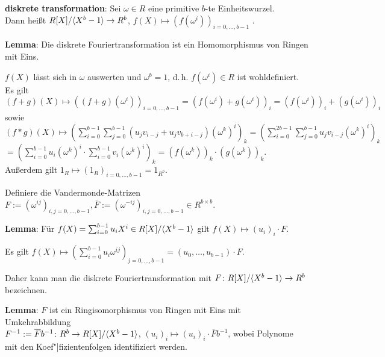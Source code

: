 \textbf{diskrete transformation}:
Sei $\omega \in R$ eine primitive $b$-te Einheitswurzel.\\
Dann heißt $R[X]/\langle X^b - 1\rangle \to R^b$,
$f(X) \mapsto (f(\omega^i))_{i=0,\dotsc,b-1}$
.

\textbf{Lemma}:
Die diskrete Fouriertransformation ist ein Homomorphismus von Ringen mit Eins.

\begin{Beweis}
    $f(X)$ lässt sich in $\omega$ auswerten und $\omega^b = 1$,
    d.\,h. $f(\omega^i) \in R$ ist wohldefiniert.\\
    Es gilt $(f + g)(X) \mapsto ((f + g)(\omega^i))_{i=0,\dotsc,b-1}
    = (f(\omega^i) + g(\omega^i))_i
    = (f(\omega^i))_i + (g(\omega^i))_i$
    sowie
    $(f \ast g)(X) \mapsto
    (\sum_{i=0}^{b-1} \sum_{j=0}^{b-1} (u_j v_{i-j} + u_j v_{b+i-j}) (\omega^k)^i)_k
    = (\sum_{i=0}^{2b-1} \sum_{j=0}^{b-1} u_j v_{i-j} (\omega^k)^i)_k$\\
    $= (\sum_{i=0}^{b-1} u_i (\omega^k)^i \cdot \sum_{i=0}^{b-1} v_i (\omega^k)^i)_k
    = (f(\omega^k))_k \cdot (g(\omega^k))_k$.\\
    Außerdem gilt $1_R \mapsto (1_R)_{i=0,\dotsc,b-1} = 1_{R^b}$.
\end{Beweis}

\linie

Definiere die Vandermonde-Matrizen $F := (\omega^{ij})_{i,j=0,\dotsc,b-1},
\overline{F} := (\omega^{-ij})_{i,j=0,\dotsc,b-1} \in R^{b \times b}$.

\textbf{Lemma}:
Für $f(X) = \sum_{i=0}^{b-1} u_i X^i \in R[X]/\langle X^b - 1\rangle$ gilt
$f(X) \mapsto (u_i)_i \cdot F$.

\begin{Beweis}
    Es gilt $f(X) \mapsto (\sum_{i=0}^{b-1} u_i \omega^{ij})_{j=0,\dotsc,b-1}
    = (u_0, \dotsc, u_{b-1}) \cdot F$.
\end{Beweis}

Daher kann man die diskrete Fouriertransformation mit
$F\colon R[X]/\langle X^b - 1\rangle \to R^b$ bezeichnen.

\linie

\textbf{Lemma}:
$F$ ist ein Ringisomorphismus von Ringen mit Eins mit
Umkehrabbildung\\
$F^{-1} := \overline{F}b^{-1}\colon R^b \to R[X]/\langle X^b - 1\rangle$,
$(u_i)_{i} \mapsto (u_i)_i \cdot \overline{F} b^{-1}$,
wobei Polynome mit den Koef"|fizientenfolgen identifiziert werden.

